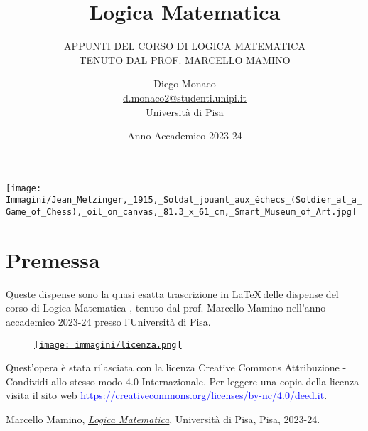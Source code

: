 \documentclass[11pt,headheight=35pt]{scrartcl}
\begin{document}
\title{Logica Matematica}
\subtitle{\large\normalfont\rmfamily\scshape APPUNTI DEL CORSO DI LOGICA MATEMATICA \\ TENUTO DAL PROF. MARCELLO MAMINO}
\author{Diego Monaco \\ \textnormal{\href{d.monaco2@studenti.unipi.it}{d.monaco2@studenti.unipi.it}} \\ Università di Pisa}
\date{Anno Accademico 2023-24}
\maketitle
\begin{center}
    \texttt{[image: Immagini/Jean\_Metzinger,\_1915,\_Soldat\_jouant\_aux\_échecs\_(Soldier\_at\_a\_Game\_of\_Chess),\_oil\_on\_canvas,\_81.3\_x\_61\_cm,\_Smart\_Museum\_of\_Art.jpg]}
\end{center}
\newpage

\tableofcontents
\newpage

\section*{Premessa}
Queste dispense sono la quasi esatta trascrizione in \LaTeX\,delle dispense del corso di Logica Matematica \cite{mamino_logica_23_24}, tenuto dal prof. Marcello Mamino nell'anno accademico 2023-24 presso l'Università di Pisa.

\vfill
\begin{wrapfigure}{R}{0.2\textwidth}
	\href{https://creativecommons.org/licenses/by-nc/4.0/deed.it}{\texttt{[image: immagini/licenza.png]}}
\end{wrapfigure}
Quest'opera è stata rilasciata con la licenza Creative Commons Attribuzione - Condividi allo stesso modo 4.0 Internazionale.
Per leggere una copia della licenza visita il sito web \href{http://creativecommons.org/licenses/by-sa/4.0/deed.it}{\textcolor{blue}{https://creativecommons.org/licenses/by-nc/4.0/deed.it}}.

\newpage

%



\begin{thebibliography}{9}
	Marcello Mamino,
	\href{https://ciovil.li/logica23/}{\textit{Logica Matematica}},
	Università di Pisa, Pisa,
	2023-24.
\end{thebibliography}
\end{document}
